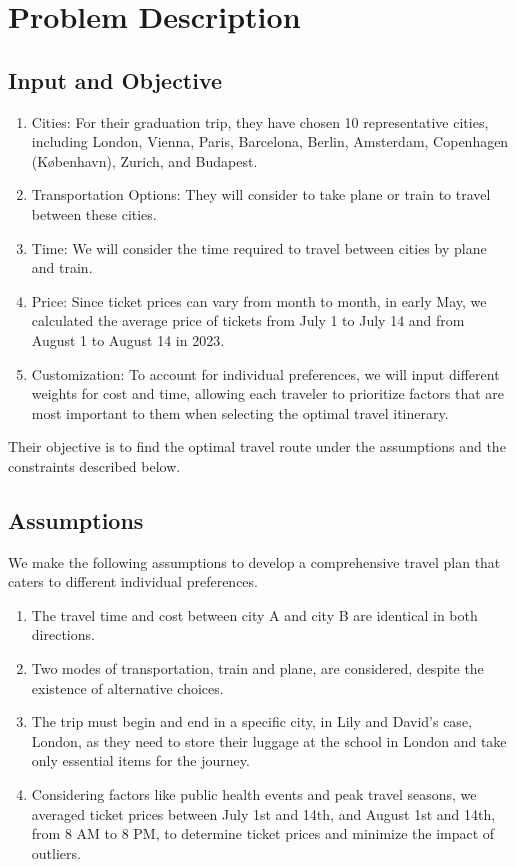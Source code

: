 \documentclass{article}
\begin{document}
\section{Problem Description}

\subsection{Input and Objective}

\begin{enumerate}
  \item Cities: For their graduation trip, they have chosen 10 representative cities,
        including London, Vienna, Paris, Barcelona, Berlin, Amsterdam, Copenhagen
        (København), Zurich, and Budapest.
  \item Transportation Options: They will consider to take plane or train to travel
        between these cities.
  \item Time: We will consider the time required to travel between cities by plane and
        train.
  \item Price: Since ticket prices can vary from month to month, in early May, we
        calculated the average price of tickets from July 1 to July 14 and from August
        1 to August 14 in 2023.
  \item Customization: To account for individual preferences, we will input different
        weights for cost and time, allowing each traveler to prioritize factors that
        are most important to them when selecting the optimal travel itinerary.
\end{enumerate}

Their objective is to find the optimal travel route under the assumptions and
the constraints described below.

\subsection{Assumptions}

We make the following assumptions to develop a comprehensive travel plan that
caters to different individual preferences.

\begin{enumerate}
  \item The travel time and cost between city A and city B are identical in both
        directions.
  \item Two modes of transportation, train and plane, are considered, despite the
        existence of alternative choices.
  \item The trip must begin and end in a specific city, in Lily and David's case,
        London, as they need to store their luggage at the school in London and take
        only essential items for the journey.
  \item Considering factors like public health events and peak travel seasons, we
        averaged ticket prices between July 1st and 14th, and August 1st and 14th, from
        8 AM to 8 PM, to determine ticket prices and minimize the impact of outliers.
\end{enumerate}
\end{document}
